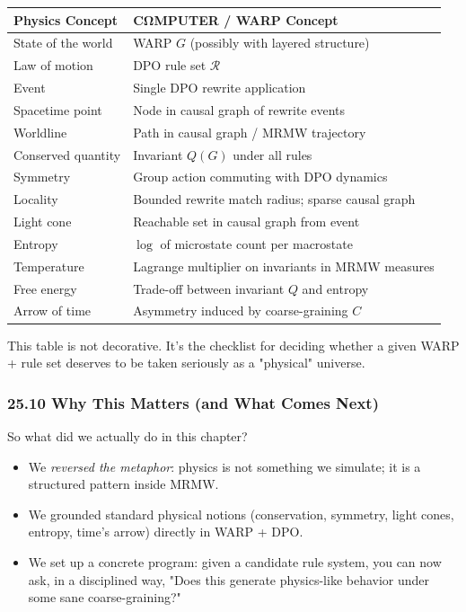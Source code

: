 \begin{center}
\begin{tabular}{ll}
\toprule
\textbf{Physics Concept} & \textbf{CΩMPUTER / WARP Concept} \\
\midrule
State of the world & WARP $G$ (possibly with layered structure) \\
Law of motion & DPO rule set $\mathcal{R}$ \\
Event & Single DPO rewrite application \\
Spacetime point & Node in causal graph of rewrite events \\
Worldline & Path in causal graph / MRMW trajectory \\
Conserved quantity & Invariant $Q(G)$ under all rules \\
Symmetry & Group action commuting with DPO dynamics \\
Locality & Bounded rewrite match radius; sparse causal graph \\
Light cone & Reachable set in causal graph from event \\
Entropy & $\log$ of microstate count per macrostate \\
Temperature & Lagrange multiplier on invariants in MRMW measures \\
Free energy & Trade-off between invariant $Q$ and entropy \\
Arrow of time & Asymmetry induced by coarse-graining $C$ \\
\bottomrule
\end{tabular}
\end{center}

This table is not decorative. It’s the checklist for deciding whether a given
WARP + rule set deserves to be taken seriously as a "physical" universe.

\subsubsection*{25.10  Why This Matters (and What Comes Next)}

So what did we actually do in this chapter?

\begin{itemize}
  \item We \emph{reversed the metaphor}: physics is not something we simulate;
        it is a structured pattern inside MRMW.

  \item We grounded standard physical notions (conservation, symmetry, light cones,
        entropy, time’s arrow) directly in WARP + DPO.

  \item We set up a concrete program: given a candidate rule system,
        you can now ask, in a disciplined way, "Does this generate physics-like
        behavior under some sane coarse-graining?"
\end{itemize}

